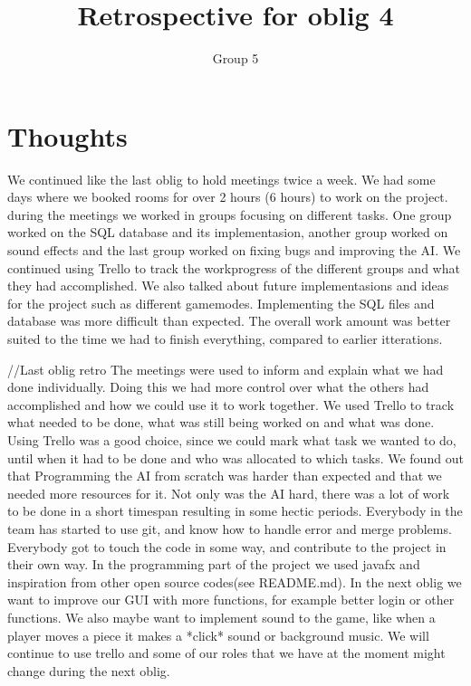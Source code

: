\documentclass{article}
\title{Retrospective for oblig 4}
\author{Group 5}
\date{}
\begin{document}
    \maketitle

    \section{Thoughts}
    \noindent
     We continued like the last oblig to hold meetings twice a week. We had some days where we booked rooms for over 2 hours (6 hours) to work on the project.
     during the meetings we worked in groups focusing on different tasks. One group worked on the SQL database and its implementasion, another group worked on sound effects
     and the last group worked on fixing bugs and improving the AI. We continued using Trello to track the workprogress of the different groups and what they had accomplished.
     We also talked about future implementasions and ideas for the project such as different gamemodes.
     Implementing the SQL files and database was more difficult than expected.
     The overall work amount was better suited to the time we had to finish everything, compared to earlier itterations.





     //Last oblig retro
      The meetings were used to inform and explain what we had
     done individually. Doing this we had more control over what the others had accomplished and how we could use it to work together.
     We used Trello to track what needed to be done, what was still being worked on and what was done. Using Trello was a good choice, since we could mark what task we
     wanted to do, until when it had to be done and who was allocated to which tasks. We found out that Programming the AI from scratch was harder than expected
     and that we needed more resources for it. Not only was the AI hard, there was a lot of work to be done in a short timespan
     resulting in some hectic periods. Everybody in the team has started to use git, and know how to handle error and merge problems.
     Everybody got to touch the code in some way, and contribute to the project in their own way. In the programming part of the project
     we used javafx and inspiration from other open source codes(see README.md). In the next oblig we want to
     improve our GUI with more functions, for example better login or other functions. We also maybe want to implement sound to the game, like when a player moves a piece it makes a *click* sound or background music. We will continue to use trello and some of our roles that we have at the moment might change during the next oblig.
\end{document}
